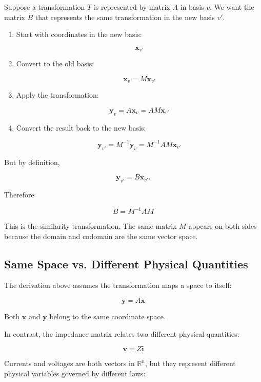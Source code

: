 Suppose a transformation $T$ is represented by matrix $A$ in basis $v$.
We want the matrix $B$ that represents the same transformation in the
new basis $v'$.

\begin{enumerate}

\item Start with coordinates in the new basis:

\[
\mathbf{x}_{v'}
\]

\item Convert to the old basis:

\[
\mathbf{x}_v = M\mathbf{x}_{v'}
\]

\item Apply the transformation:

\[
\mathbf{y}_v = A\mathbf{x}_v = AM\mathbf{x}_{v'}
\]

\item Convert the result back to the new basis:

\[
\mathbf{y}_{v'} = M^{-1}\mathbf{y}_v
                 = M^{-1}AM\mathbf{x}_{v'}
\]

\end{enumerate}

But by definition,

\[
\mathbf{y}_{v'} = B\mathbf{x}_{v'}.
\]

Therefore

\[
\boxed{B = M^{-1}AM}
\]

This is the similarity transformation. The same matrix $M$ appears on
both sides because the domain and codomain are the same vector space.

\subsection{Same Space vs. Different Physical Quantities}
\label{sec:same-vs-different}

The derivation above assumes the transformation maps a space to itself:

\[
\mathbf{y} = A\mathbf{x}
\]

Both $\mathbf{x}$ and $\mathbf{y}$ belong to the same coordinate space.

\bigskip

In contrast, the impedance matrix relates two different physical
quantities:

\[
\mathbf{v} = Z\mathbf{i}
\]

Currents and voltages are both vectors in $\mathbb{R}^n$, but they
represent different physical variables governed by different laws:

